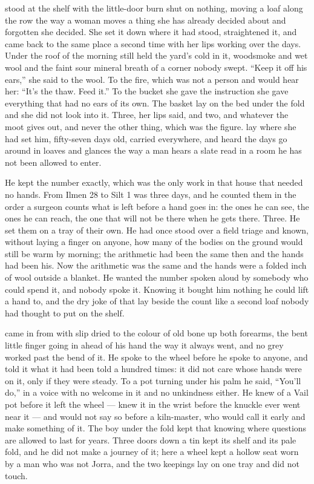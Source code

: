 
 stood at the shelf with the little-door burn shut on nothing, moving a loaf along the row the way a woman moves a thing she has already decided about and forgotten she decided. She set it down where it had stood, straightened it, and came back to the same place a second time with her lips working over the days. Under the roof of  the morning still held the yard's cold in it, woodsmoke and wet wool and the faint sour mineral breath of a corner nobody swept. “Keep it off his ears,” she said to the wool. To the fire, which was not a person and would hear her: “It's the thaw. Feed it.” To the bucket she gave the instruction she gave everything that had no ears of its own. The basket lay on the bed under the fold and she did not look into it. Three, her lips said, and two, and whatever the moot gives out, and never the other thing, which was the figure.  lay where she had set him, fifty-seven days old, carried everywhere, and heard the days go around in loaves and glances the way a man hears a slate read in a room he has not been allowed to enter.

He kept the number exactly, which was the only work in that house that needed no hands. From Ilmen 28 to Silt 1 was three days, and he counted them in the order a surgeon counts what is left before a hand goes in: the ones he can see, the ones he can reach, the one that will not be there when he gets there. Three. He set them on a tray of their own. He had once stood over a field triage and known, without laying a finger on anyone, how many of the bodies on the ground would still be warm by morning; the arithmetic had been the same then and the hands had been his. Now the arithmetic was the same and the hands were a folded inch of wool outside a blanket. He wanted the number spoken aloud by somebody who could spend it, and nobody spoke it. Knowing it bought him nothing he could lift a hand to, and the dry joke of that lay beside the count like a second loaf nobody had thought to put on the shelf.

 came in from  with slip dried to the colour of old bone up both forearms, the bent little finger going in ahead of his hand the way it always went, and no grey worked past the bend of it. He spoke to the wheel before he spoke to anyone, and told it what it had been told a hundred times: it did not care whose hands were on it, only if they were steady. To a pot turning under his palm he said, “You'll do,” in a voice with no welcome in it and no unkindness either. He knew  of a Vail pot before it left the wheel --- knew it in the wrist before the knuckle ever went near it --- and would not say so before a kiln-master, who would call it early and make something of it. The boy under the fold kept that knowing where questions are allowed to last for years. Three doors down  a tin kept its shelf and its pale fold, and he did not make a journey of it; here a wheel kept a hollow seat worn by a man who was not Jorra, and the two keepings lay on one tray and did not touch.

